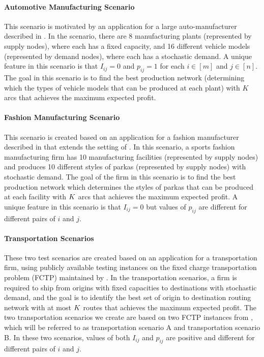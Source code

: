 \documentclass{article} %
\begin{document}
\paragraph{Automotive Manufacturing Scenario }
This scenario is motivated by an application for a large auto-manufacturer described in \citet{JG95}. In the scenario, there are 8 manufacturing plants (represented by supply nodes), where each has a fixed capacity, and 16 different vehicle models (represented by demand nodes), where each has a stochastic demand. A unique feature in this scenario is that $I_{ij}=0$ and $p_{ij}=1$ for each $i\in[m]$ and $j\in[n]$.
The goal in this scenario is to find the best production network (determining which the types of vehicle models that can be produced at each plant) with $K$ arcs that achieves the maximum expected profit.



\paragraph{ Fashion Manufacturing Scenario}  
This scenario is created based on an application for a fashion manufacturer described in \citet{chou2014performance} that extends the setting of \citet{hammond1996sport}. In this scenario, a sports fashion manufacturing firm has 10 manufacturing facilities (represented by supply nodes) and produces 10 different styles of parkas (represented by supply nodes) with stochastic demand. The goal of the firm in this scenario is to find the best production network which determines the styles of parkas that can be produced at each facility with $K$ arcs that achieves the maximum expected profit. A unique feature in this scenario is that $I_{ij}=0$  but values of $p_{ij}$ are different for different pairs of $i$ and $j$.




\paragraph {Transportation Scenarios} 
These two test scenarios are created based on an application for a transportation firm, using publicly available testing instances on the fixed charge transportation problem (FCTP) maintained by \citet{mittelmann2005decision}. In the transportation scenarios, a firm is required to ship from origins with fixed capacities to destinations with stochastic demand, and the goal is to identify the best set of origin to destination routing network with at most $K$ routes that achieves the maximum expected profit. The two transportation scenarios we create are based on two FCTP instances from \citet{mittelmann2005decision}, which will be referred to as transportation scenario A and transportation scenario B. In these two scenarios, values of both $I_{ij}$ and $p_{ij}$ are positive and different for different pairs of $i$ and $j$.
\end{document}
